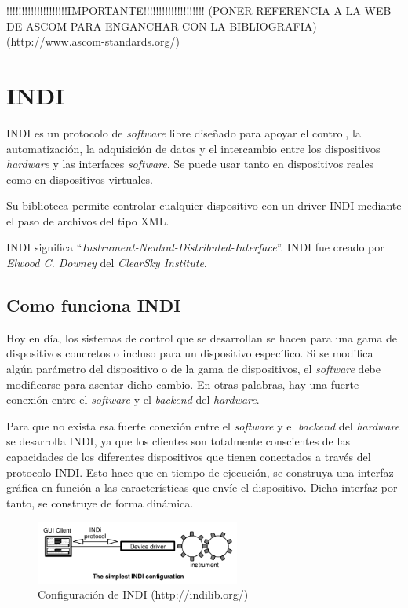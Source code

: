 !!!!!!!!!!!!!!!!!!!!IMPORTANTE!!!!!!!!!!!!!!!!!!!!
(PONER REFERENCIA A LA WEB DE ASCOM PARA ENGANCHAR CON LA BIBLIOGRAFIA)  (http://www.ascom-standards.org/)

\section{INDI}
INDI es un protocolo de \textit{software} libre diseñado para apoyar el control, la automatización, la adquisición de datos y el intercambio entre los dispositivos \textit{hardware} y las interfaces \textit{software}. Se puede usar tanto en dispositivos reales como en dispositivos virtuales.

Su biblioteca permite controlar cualquier dispositivo con un driver INDI mediante el paso de archivos del tipo XML.

INDI significa “\textit{Instrument-Neutral-Distributed-Interface}”. INDI fue creado por \textit{Elwood C. Downey} del \textit{ClearSky Institute}.

\subsection{Como funciona INDI}
Hoy en día, los sistemas de control que se desarrollan se hacen para una gama de dispositivos concretos o incluso para un dispositivo específico. Si se modifica algún parámetro del dispositivo o de la gama de dispositivos, el \textit{software} debe modificarse para asentar dicho cambio. En otras palabras, hay una fuerte conexión entre el \textit{software} y el \textit{backend} del \textit{hardware}.

Para que no exista esa fuerte conexión entre el \textit{software} y el \textit{backend} del \textit{hardware} se desarrolla INDI,  ya que los clientes son totalmente conscientes de las capacidades de los diferentes dispositivos que tienen conectados a través del protocolo INDI. Esto hace que en tiempo de ejecución, se construya una interfaz gráfica en función a las características que envíe el dispositivo. Dicha interfaz por tanto, se construye de forma dinámica.

\begin{figure}[htb]
\centering
\includegraphics[width=0.6\textwidth]{./imagenes/funcionINDI}
\caption{Configuración de INDI (http://indilib.org/)} \label{fig:funcionINDI}
\end{figure}

